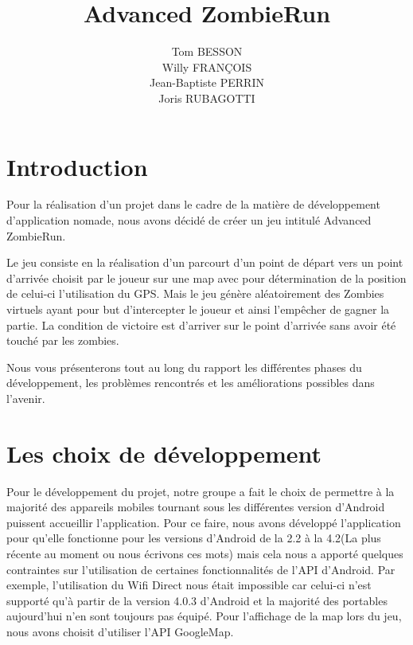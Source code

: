 \documentclass{article}
\title{Advanced ZombieRun}     %
\author{Tom BESSON\\ Willy FRANÇOIS\\ Jean-Baptiste PERRIN\\ Joris RUBAGOTTI}
\begin{document}
\maketitle


\newpage


\tableofcontents


\newpage


\section{Introduction}


Pour la réalisation d'un projet dans le cadre de la matière de développement d'application nomade, nous avons décidé de créer un jeu intitulé Advanced\\ ZombieRun.

Le jeu consiste en la réalisation d'un parcourt d'un point de départ vers un point d'arrivée choisit par le joueur sur une map avec pour détermination de la position de celui-ci l'utilisation du GPS. Mais le jeu génère aléatoirement des Zombies virtuels ayant pour but d'intercepter le joueur et ainsi l'empêcher de gagner la partie.
La condition de victoire est d'arriver sur le point d'arrivée sans avoir été touché par les zombies.

Nous vous présenterons tout au long du rapport les différentes phases du développement, les problèmes rencontrés et les améliorations possibles dans l'avenir.


\section{Les choix de développement}

Pour le développement du projet, notre groupe a fait le choix de permettre à la majorité des appareils mobiles tournant sous les différentes version d'Android puissent accueillir l'application. Pour ce faire, nous avons développé l'application pour qu'elle fonctionne pour les versions d'Android de la 2.2 à la 4.2(La plus récente au moment ou nous écrivons ces mots) mais cela nous a apporté quelques contraintes sur l'utilisation de certaines fonctionnalités de l'API d'Android. Par exemple, l'utilisation du Wifi Direct nous était impossible car celui-ci n'est supporté qu'à partir de la version 4.0.3 d'Android et la majorité des portables aujourd'hui n'en sont toujours pas équipé.
Pour l'affichage de la map lors du jeu, nous avons choisit d'utiliser l'API GoogleMap.  

\newpage
\end{document}
